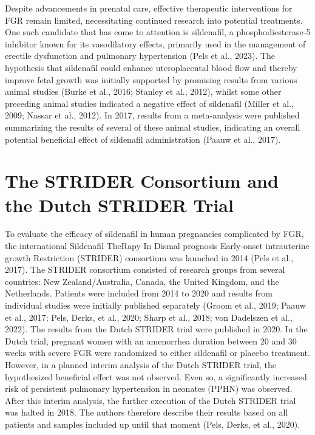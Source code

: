 \documentclass[authordate, reflection]{jote-new-article}
\begin{document}
	Despite advancements in prenatal care, effective therapeutic interventions for FGR remain limited, necessitating continued research into potential treatments. One such candidate that has come to attention is sildenafil, a phosphodiesterase-5 inhibitor known for its vasodilatory effects, primarily used in the management of erectile dysfunction and pulmonary hypertension (Pels et al., 2023). The hypothesis that sildenafil could enhance uteroplacental blood flow and thereby improve fetal growth was initially supported by promising results from various animal studies (Burke et al., 2016; Stanley et al., 2012), whilst some other preceding animal studies indicated a negative effect of sildenafil (Miller et al., 2009; Nassar et al., 2012). In 2017, results from a meta-analysis were published summarizing the results of several of these animal studies, indicating an overall potential beneficial effect of sildenafil administration (Paauw et al., 2017).




	




	\section{The STRIDER Consortium and the Dutch STRIDER Trial}



	To evaluate the efficacy of sildenafil in human pregnancies complicated by FGR, the international Sildenafil TheRapy In Dismal prognosis Early-onset intrauterine growth Restriction (STRIDER) consortium was launched in 2014 (Pels et al., 2017). The STRIDER consortium consisted of research groups from several countries: New Zealand/Australia, Canada, the United Kingdom, and the Netherlands. Patients were included from 2014 to 2020 and results from individual studies were initially published separately (Groom et al., 2019; Paauw et al., 2017; Pels, Derks, et al., 2020; Sharp et al., 2018; von Dadelszen et al., 2022). The results from the Dutch STRIDER trial were published in 2020. In the Dutch trial, pregnant women with an amenorrhea duration between 20 and 30 weeks with severe FGR were randomized to either sildenafil or placebo treatment. However, in a planned interim analysis of the Dutch STRIDER trial, the hypothesized beneficial effect was not observed. Even so, a significantly increased risk of persistent pulmonary hypertension in neonates (PPHN) was observed. After this interim analysis, the further execution of the Dutch STRIDER trial was halted in 2018. The authors therefore describe their results based on all patients and samples included up until that moment (Pels, Derks, et al., 2020).
\end{document}
